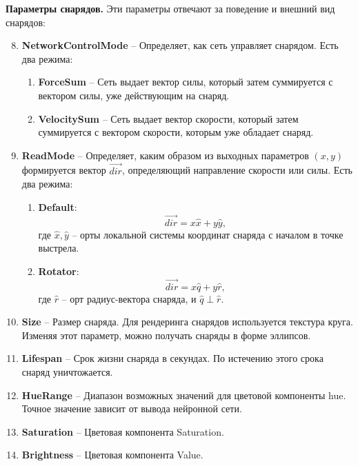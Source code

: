 \textbf{Параметры снарядов.} Эти параметры отвечают за поведение и внешний вид снарядов:
\begin{enumerate}
    \setcounter{enumi}{7}
    \item {\small \textbf{NetworkControlMode}} -- Определяет, как сеть управляет снарядом. Есть два режима:
    \begin{enumerate}[label=\textbullet]
        \item {\small \textbf{ForceSum}} -- Сеть выдает вектор силы, который затем суммируется с вектором силы, уже действующим на снаряд.
        \item {\small \textbf{VelocitySum}} -- Сеть выдает вектор скорости, который затем суммируется с вектором скорости, которым уже обладает снаряд.
    \end{enumerate}
    \item {\small \textbf{ReadMode}} -- Определяет, каким образом из выходных параметров $(x, y)$ формируется вектор $\overrightarrow{dir}$, определяющий направление скорости или силы. Есть два режима:
    \begin{enumerate}[label=\textbullet]
        \item {\small \textbf{Default}}: \[ \overrightarrow{dir}=x\hat{x}+y\hat{y}, \]
        где $\hat{x}, \hat{y}$ -- орты локальной системы координат снаряда с началом в точке выстрела.

        \item {\small \textbf{Rotator}}: \[ \overrightarrow{dir}=x\hat{q}+y\hat{r}, \]
        где $\hat{r}$ -- орт радиус-вектора снаряда, и $\hat{q} \perp \hat{r}$.

    \end{enumerate}
    \item {\small \textbf{Size}} -- Размер снаряда. Для рендеринга снарядов используется текстура круга. Изменяя этот параметр, можно получать снаряды в форме эллипсов.
    \item {\small \textbf{Lifespan}} -- Срок жизни снаряда в секундах. По истечению этого срока снаряд уничтожается.
    \item {\small \textbf{HueRange}} -- Диапазон возможных значений для цветовой компоненты hue. Точное значение зависит от вывода нейронной сети.
    \item {\small \textbf{Saturation}} -- Цветовая компонента Saturation.
    \item {\small \textbf{Brightness}} -- Цветовая компонента Value.
\end{enumerate}

